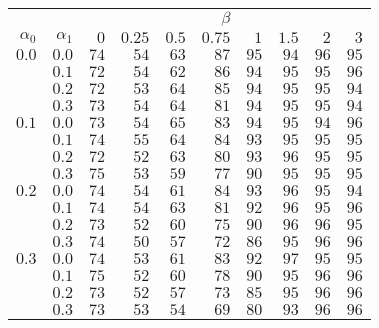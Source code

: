 \begin{tabular}{rr|rrrrrrrr}
\hline\hline
 && \multicolumn{8}{c}{$\beta$}\\
 $\alpha_0$ & $\alpha_1$ & $0$ & $0.25$ & $0.5$ & $0.75$ & $1$ & $1.5$ & $2$ & $3$ \\ 
 \hline
$0.0$ & $0.0$ & $74$ & $54$ & $63$ & $87$ & $95$ & $94$ & $96$ & $95$\\ 
 & $0.1$ & $72$ & $54$ & $62$ & $86$ & $94$ & $95$ & $95$ & $96$\\ 
 & $0.2$ & $72$ & $53$ & $64$ & $85$ & $94$ & $95$ & $95$ & $94$\\ 
 & $0.3$ & $73$ & $54$ & $64$ & $81$ & $94$ & $95$ & $95$ & $94$\\ 
\hline 
 $0.1$ & $0.0$ & $73$ & $54$ & $65$ & $83$ & $94$ & $95$ & $94$ & $96$\\ 
 & $0.1$ & $74$ & $55$ & $64$ & $84$ & $93$ & $95$ & $95$ & $95$\\ 
 & $0.2$ & $72$ & $52$ & $63$ & $80$ & $93$ & $96$ & $95$ & $95$\\ 
 & $0.3$ & $75$ & $53$ & $59$ & $77$ & $90$ & $95$ & $95$ & $95$\\ 
\hline 
 $0.2$ & $0.0$ & $74$ & $54$ & $61$ & $84$ & $93$ & $96$ & $95$ & $94$\\ 
 & $0.1$ & $74$ & $54$ & $63$ & $81$ & $92$ & $96$ & $95$ & $96$\\ 
 & $0.2$ & $73$ & $52$ & $60$ & $75$ & $90$ & $96$ & $96$ & $95$\\ 
 & $0.3$ & $74$ & $50$ & $57$ & $72$ & $86$ & $95$ & $96$ & $96$\\ 
\hline 
 $0.3$ & $0.0$ & $74$ & $53$ & $61$ & $83$ & $92$ & $97$ & $95$ & $95$\\ 
 & $0.1$ & $75$ & $52$ & $60$ & $78$ & $90$ & $95$ & $96$ & $96$\\ 
 & $0.2$ & $73$ & $52$ & $57$ & $73$ & $85$ & $95$ & $96$ & $96$\\ 
 & $0.3$ & $73$ & $53$ & $54$ & $69$ & $80$ & $93$ & $96$ & $96$\\ 
 \hline 
 \end{tabular}